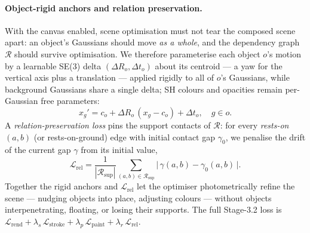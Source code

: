 \paragraph{Object-rigid anchors and relation preservation.}
With the canvas enabled, scene optimisation must not tear the composed scene
apart: an object's Gaussians should move \emph{as a whole}, and the
dependency graph $\mathcal{R}$ should survive optimisation. We therefore
parameterise each object $o$'s motion by a learnable SE(3) delta
$(\Delta R_o, \Delta t_o)$ about its centroid --- a yaw for the vertical axis
plus a translation --- applied rigidly to all of $o$'s Gaussians, while
background Gaussians share a single delta; SH colours and opacities remain
per-Gaussian free parameters:
\begin{equation}
x_g' = c_o + \Delta R_o\,(x_g - c_o) + \Delta t_o, \quad g \in o.
\end{equation}
A \emph{relation-preservation loss} pins the support contacts of
$\mathcal{R}$: for every \emph{rests-on}$(a,b)$ (or rests-on-ground) edge
with initial contact gap $\gamma_0$, we penalise the drift of the current
gap $\gamma$ from its initial value,
\begin{equation}
\mathcal{L}_\text{rel} =
\frac{1}{|\mathcal{R}_\text{sup}|}
\sum_{(a,b)\in\mathcal{R}_\text{sup}}
\big|\,\gamma(a,b) - \gamma_0(a,b)\,\big|.
\end{equation}
Together the rigid anchors and $\mathcal{L}_\text{rel}$ let the optimiser
photometrically refine the scene --- nudging objects into place, adjusting
colours --- without objects interpenetrating, floating, or losing their
supports. The full Stage-3.2 loss is
$\mathcal{L}_\text{rend} + \lambda_s\, \mathcal{L}_\text{stroke} + \lambda_p\,
\mathcal{L}_\text{paint} + \lambda_r\, \mathcal{L}_\text{rel}$.
